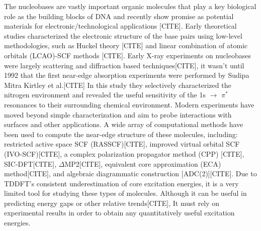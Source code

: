 \documentclass[11.5pt]{article}
\begin{document}
  The nucleobases are vastly important organic molecules that play a key biological role as the building blocks of DNA and recently show promise as potential materials for electronic/technological applications [CITE]. Early theoretical studies characterized the electronic structure of the base pairs using low-level methodologies, such as Huckel theory [CITE] and linear combination of atomic orbitals (LCAO)-SCF methods [CITE]. Early X-ray experiments on nucleobases were largely scattering and diffraction based techniques[CITE], it wasn't until 1992 that the first near-edge absorption experiments were performed by Sudipa Mitra Kirtley et al.[CITE] In this study they selectively characterized the nitrogen environment and revealed the useful sensitivity of the 1s $\rightarrow$ $\pi^*$ resonances to their surrounding chemical environment. Modern experiments have moved beyond simple characterization and aim to probe interactions with surfaces and other applications.  A wide array of computational methods have been used to compute the near-edge structure of these molecules, including: restricted active space SCF (RASSCF)[CITE], improved virtual orbital SCF (IVO-SCF)[CITE], a complex polarization propagator method (CPP) [CITE], SIC-DFT[CITE], $\Delta$MP2[CITE], equivalent core approximation (ECA) method[CITE], and algebraic diagrammatic construction [ADC(2)][CITE]. Due to TDDFT's consistent underestimation of core excitation energies, it is a very limited tool for studying these types of molecules. Although it can be useful in predicting energy gaps or other relative trends[CITE], It must rely on experimental results in order to obtain any quantitatively useful excitation energies.

\end{document}
